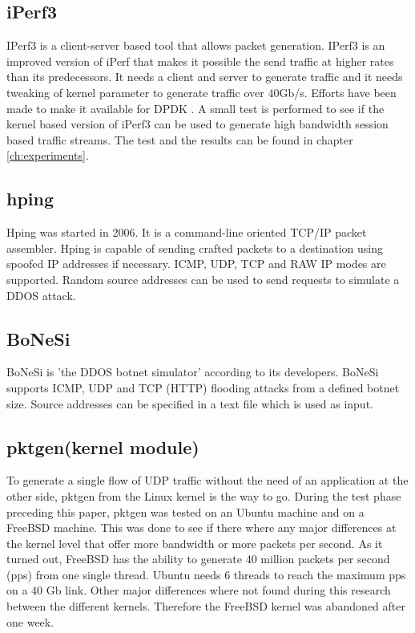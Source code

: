 \subsection{iPerf3}\label{sub:iperf3}
IPerf3 is a client-server based tool that allows packet generation.
IPerf3 is an improved version of iPerf that makes it possible the send traffic at higher rates than its predecessors. It needs a client and server to generate traffic and it needs tweaking of kernel parameter to generate traffic over 40Gb/s. Efforts have been made to make it available for DPDK \cite{jelte}.     
A small test is performed to see if the kernel based version of iPerf3 can be used to generate high bandwidth session based traffic streams. The test and the results can be found in chapter \ref{ch:experiments}.

\subsection{hping}\label{sub:hping}
Hping was started in 2006. It is a command-line oriented TCP/IP packet assembler. Hping is capable of sending crafted packets to a destination using spoofed IP addresses if necessary. ICMP, UDP, TCP and RAW IP modes are supported. Random source addresses can be used to send requests to simulate a DDOS attack.    

\subsection{BoNeSi}\label{sub:bonesi}
BoNeSi is 'the DDOS botnet simulator' according to its developers. BoNeSi supports ICMP, UDP and TCP (HTTP) flooding attacks from a defined botnet size. Source addresses can be specified in a text file which is used as input. 

\subsection{pktgen(kernel module)}\label{sub:pktgen}
To generate a single flow of UDP traffic without the need of an application at the other side, pktgen from the Linux kernel is the way to go. During the test phase preceding this paper, pktgen was tested on an Ubuntu machine and on a FreeBSD machine. 
This was done to see if there where any major differences at the kernel level that offer more bandwidth or more packets per second. As it turned out, FreeBSD has the ability to generate 40 million packets per second (pps) from one single thread. Ubuntu needs 6 threads to reach the maximum pps on a 40 Gb link. Other major differences where not found during this research between the different kernels. Therefore the FreeBSD kernel was abandoned after one week. 

